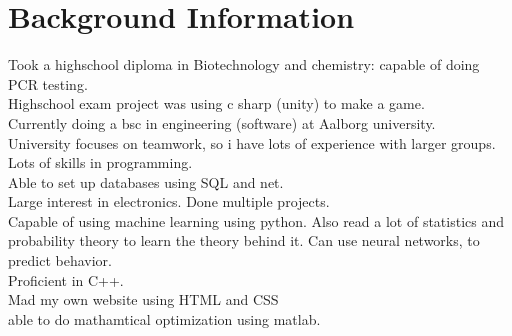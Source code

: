 \section*{Background Information}
Took a highschool diploma in Biotechnology and chemistry: capable of doing PCR testing.\\Highschool exam project was using c sharp (unity) to make a game.\\Currently doing a bsc in engineering (software) at Aalborg university.\\University focuses on teamwork, so i have lots of experience with larger groups.\\Lots of skills in programming.\\Able to set up databases using SQL and net.\\Large interest in electronics. Done multiple projects.\\Capable of using machine learning using python. Also read a lot of statistics and probability theory to learn the theory behind it. Can use neural networks, to predict behavior.\\Proficient in C++.\\Mad my own website using HTML and CSS\\able to do mathamtical optimization using matlab.\\
